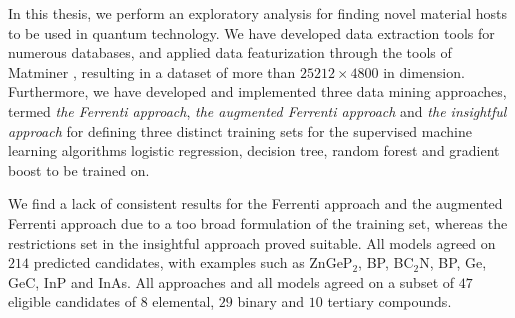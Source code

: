 In this thesis, we perform an exploratory analysis for finding novel material hosts to be used in quantum technology. We have developed data extraction tools for numerous databases, and applied data featurization through the tools of Matminer \cite{Ward2018}, resulting in a dataset of more than $25212\times4800$ in dimension. Furthermore, we have developed and implemented three data mining approaches, termed \textit{the Ferrenti approach}, \textit{the augmented Ferrenti approach} and \textit{the insightful approach} for defining three distinct training sets for the supervised machine learning algorithms logistic regression, decision tree, random forest and gradient boost to be trained on.

We find a lack of consistent results for the Ferrenti approach and the augmented Ferrenti approach due to a too broad formulation of the training set, whereas the restrictions set in the insightful approach proved suitable. All models agreed on $214$ predicted candidates, with examples such as ZnGeP$_2$, BP, BC$_2$N, BP, Ge, GeC, InP and InAs. All approaches and all models agreed on a subset of $47$ eligible candidates of $8$ elemental, $29$ binary and $10$ tertiary compounds.

